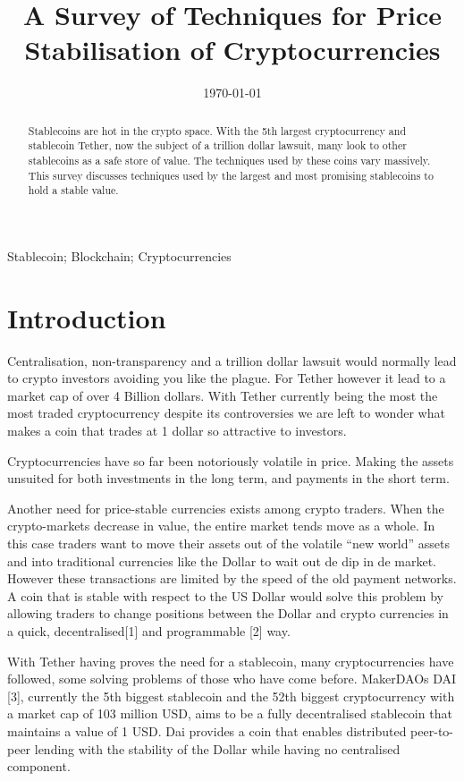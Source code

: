 \documentclass[english,]{IEEEtran}
\title{A Survey of Techniques for Price Stabilisation of Cryptocurrencies}
\author{
            \IEEEauthorblockN{Robert Wessel Blokzijl}
        \IEEEauthorblockA{%
            TU Delft \\
            Delft, The Netherlands \\
            R.W.Blokzijl@student.tudelft.nl}
        }
\date{\today}
\begin{document}
\maketitle
\begin{abstract}
Stablecoins are hot in the crypto space. With the 5th largest
cryptocurrency and stablecoin Tether, now the subject of a trillion
dollar lawsuit, many look to other stablecoins as a safe store of value.
The techniques used by these coins vary massively. This survey discusses
techniques used by the largest and most promising stablecoins to hold a
stable value.
\end{abstract}

\begin{IEEEkeywords}
    Stablecoin;
    Blockchain;
    Cryptocurrencies\end{IEEEkeywords}

\section{Introduction}\label{introduction}

Centralisation, non-transparency and a trillion dollar lawsuit would
normally lead to crypto investors avoiding you like the plague. For
Tether however it lead to a market cap of over 4 Billion dollars. With
Tether currently being the most the most traded cryptocurrency despite
its controversies we are left to wonder what makes a coin that trades at
1 dollar so attractive to investors.

Cryptocurrencies have so far been notoriously volatile in price. Making
the assets unsuited for both investments in the long term, and payments
in the short term.

Another need for price-stable currencies exists among crypto traders.
When the crypto-markets decrease in value, the entire market tends move
as a whole. In this case traders want to move their assets out of the
volatile ``new world'' assets and into traditional currencies like the
Dollar to wait out de dip in de market. However these transactions are
limited by the speed of the old payment networks. A coin that is stable
with respect to the US Dollar would solve this problem by allowing
traders to change positions between the Dollar and crypto currencies in
a quick, decentralised{[}1{]} and programmable {[}2{]} way.

With Tether having proves the need for a stablecoin, many
cryptocurrencies have followed, some solving problems of those who have
come before. MakerDAOs DAI {[}3{]}, currently the 5th biggest stablecoin
and the 52th biggest cryptocurrency with a market cap of 103 million
USD, aims to be a fully decentralised stablecoin that maintains a value
of 1 USD. Dai provides a coin that enables distributed peer-to-peer
lending with the stability of the Dollar while having no centralised
component.
\end{document}
